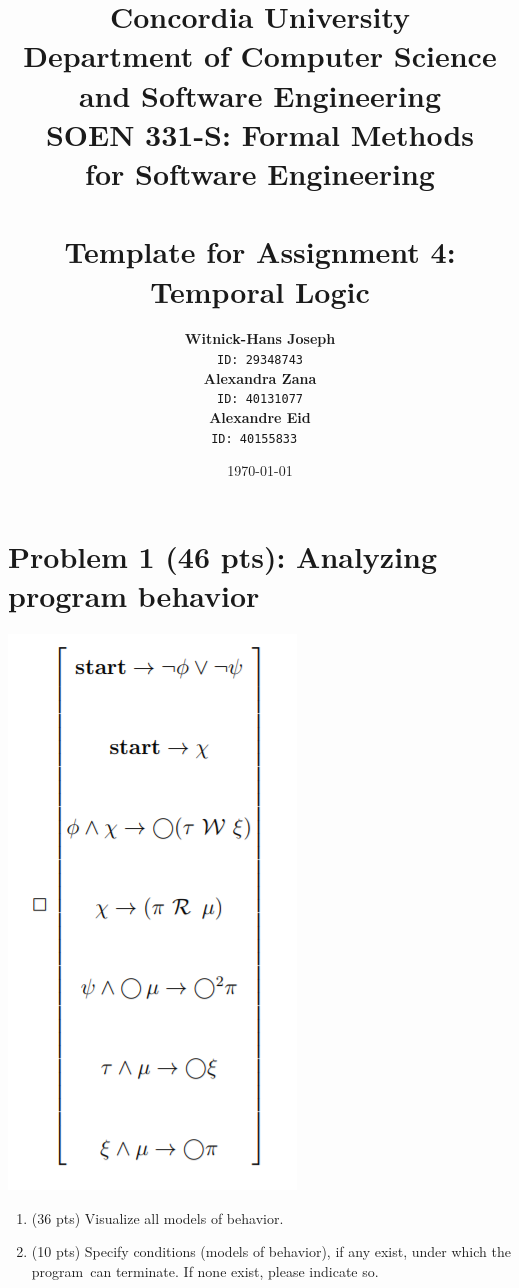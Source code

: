 \documentclass[12pt]{article}
\title{Concordia University\\
Department of Computer Science and Software Engineering\\
\textbf{SOEN 331-S: Formal Methods\\for Software Engineering}\\
\ \\
\textbf{Template for Assignment 4:\\Temporal Logic}}
\author{\textbf{Witnick-Hans Joseph}\\
		\texttt{ID: 29348743}\\
		\textbf{Alexandra Zana}\\
		\texttt{ID: 40131077}\\
		\textbf{Alexandre Eid}\\
		\texttt{ID: 40155833}
\ \\}
\date{\today}
\begin{document}
\maketitle

\newpage

\section{Problem 1 (46 pts): Analyzing program behavior}

\includegraphics{p1-model.png}

\begin{enumerate}

	\item (36 pts) Visualize all models of behavior.

	\item (10 pts) Specify conditions (models of behavior), if any exist, under which the program\
	can terminate. If none exist, please indicate so.
		
\end{enumerate}
\end{document}

